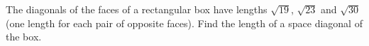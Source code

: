The diagonals of the faces of a rectangular box have lengths $\sqrt{19}$, $\sqrt{23}$ and $\sqrt{30}$ (one length for each pair of opposite faces). Find the length of a space diagonal of the box.
